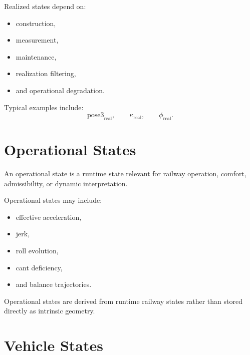 \begin{remark}
Realized states depend on:
\begin{itemize}
\item construction,
\item measurement,
\item maintenance,
\item realization filtering,
\item and operational degradation.
\end{itemize}
\end{remark}

\begin{remark}
Typical examples include:
\[
\mathrm{pose3}_{\mathrm{real}},
\qquad
\kappa_{\mathrm{real}},
\qquad
\phi_{\mathrm{real}}.
\]
\end{remark}

\section{Operational States}

\begin{definition}
\label{def:taxonomy-operational-state}
An operational state is a runtime state relevant for railway operation,
comfort, admissibility, or dynamic interpretation.
\end{definition}

\begin{remark}
Operational states may include:
\begin{itemize}
\item effective acceleration,
\item jerk,
\item roll evolution,
\item cant deficiency,
\item and balance trajectories.
\end{itemize}
\end{remark}

\begin{remark}
Operational states are derived from runtime railway states rather than
stored directly as intrinsic geometry.
\end{remark}

\section{Vehicle States}


